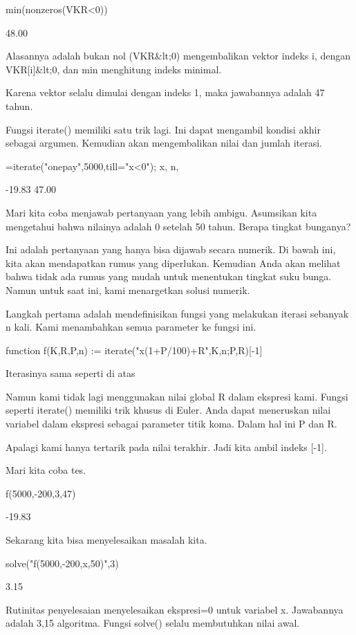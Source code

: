 \documentclass{article}
\begin{document}
\>min(nonzeros(VKR<0))


          48.00 

Alasannya adalah bukan nol (VKR&lt;0) mengembalikan vektor indeks i,
dengan VKR[i]&lt;0, dan min menghitung indeks minimal.


Karena vektor selalu dimulai dengan indeks 1, maka jawabannya adalah
47 tahun.


Fungsi iterate() memiliki satu trik lagi. Ini dapat mengambil kondisi
akhir sebagai argumen. Kemudian akan mengembalikan nilai dan jumlah
iterasi.


=iterate("onepay",5000,till="x<0"); x, n,


         -19.83 
          47.00 

Mari kita coba menjawab pertanyaan yang lebih ambigu. Asumsikan kita
mengetahui bahwa nilainya adalah 0 setelah 50 tahun. Berapa tingkat
bunganya?


Ini adalah pertanyaan yang hanya bisa dijawab secara numerik. Di bawah
ini, kita akan mendapatkan rumus yang diperlukan. Kemudian Anda akan
melihat bahwa tidak ada rumus yang mudah untuk menentukan tingkat suku
bunga. Namun untuk saat ini, kami menargetkan solusi numerik.


Langkah pertama adalah mendefinisikan fungsi yang melakukan iterasi
sebanyak n kali. Kami menambahkan semua parameter ke fungsi ini.


\>function f(K,R,P,n) := iterate("x\*(1+P/100)+R",K,n;P,R)[-1]


Iterasinya sama seperti di atas


Namun kami tidak lagi menggunakan nilai global R dalam ekspresi kami.
Fungsi seperti iterate() memiliki trik khusus di Euler. Anda dapat
meneruskan nilai variabel dalam ekspresi sebagai parameter titik koma.
Dalam hal ini P dan R.


Apalagi kami hanya tertarik pada nilai terakhir. Jadi kita ambil
indeks [-1].


Mari kita coba tes.


\>f(5000,-200,3,47)


         -19.83 

Sekarang kita bisa menyelesaikan masalah kita.


\>solve("f(5000,-200,x,50)",3)


           3.15 

Rutinitas penyelesaian menyelesaikan ekspresi=0 untuk variabel x.
Jawabannya adalah 3,15%
algoritma. Fungsi solve() selalu membutuhkan nilai awal.
\end{document}
